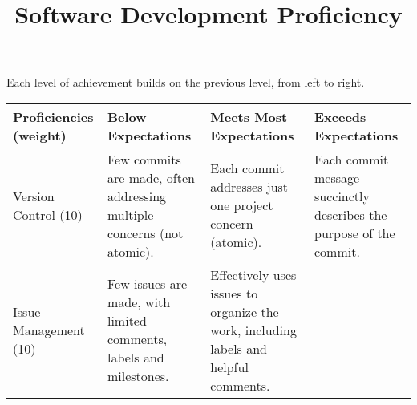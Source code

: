 \documentclass[10pt,letter]{article}
\title{Software Development Proficiency}
\date{}
\begin{document}
\newcommand{\makespace}{\vspace*{2.8cm}}
\lstset{basicstyle=\footnotesize}


Each level of achievement builds on the previous level, from left to
right.

\begin{longtable}[]{@{}llll@{}}
\toprule
\begin{minipage}[b]{0.13\columnwidth}\raggedright\strut
Proficiencies (weight)\strut
\end{minipage} & \begin{minipage}[b]{0.23\columnwidth}\raggedright\strut
Below Expectations\strut
\end{minipage} & \begin{minipage}[b]{0.28\columnwidth}\raggedright\strut
Meets Most Expectations\strut
\end{minipage} & \begin{minipage}[b]{0.25\columnwidth}\raggedright\strut
Exceeds Expectations\strut
\end{minipage}\tabularnewline
\midrule
\endhead
\begin{minipage}[t]{0.13\columnwidth}\raggedright\strut
Version Control (10)\strut
\end{minipage} & \begin{minipage}[t]{0.23\columnwidth}\raggedright\strut
Few commits are made, often addressing multiple concerns (not
atomic).\strut
\end{minipage} & \begin{minipage}[t]{0.28\columnwidth}\raggedright\strut
Each commit addresses just one project concern (atomic).\strut
\end{minipage} & \begin{minipage}[t]{0.25\columnwidth}\raggedright\strut
Each commit message succinctly describes the purpose of the
commit.\strut
\end{minipage}\tabularnewline
\begin{minipage}[t]{0.13\columnwidth}\raggedright\strut
Issue Management (10)\strut
\end{minipage} & \begin{minipage}[t]{0.23\columnwidth}\raggedright\strut
Few issues are made, with limited comments, labels and milestones.\strut
\end{minipage} & \begin{minipage}[t]{0.28\columnwidth}\raggedright\strut
Effectively uses issues to organize the work, including labels and
helpful comments.\strut
\end{minipage} & \begin{minipage}[t]{0.25\columnwidth}\raggedright\strut

\end{minipage}
\end{longtable}
\end{document}

